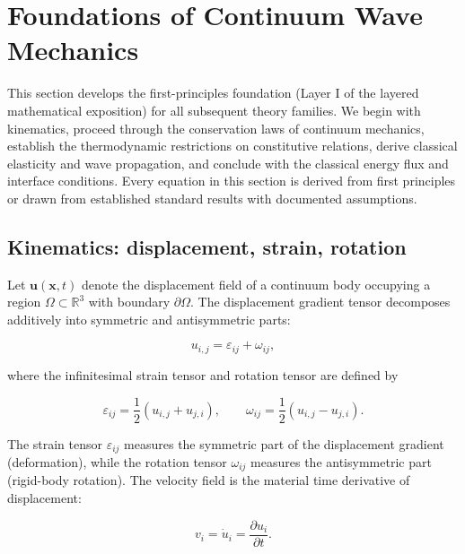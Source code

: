 \section{Foundations of Continuum Wave Mechanics}
\label{sec:foundations}

This section develops the first-principles foundation (Layer I of the layered mathematical exposition) for all subsequent theory families. We begin with kinematics, proceed through the conservation laws of continuum mechanics, establish the thermodynamic restrictions on constitutive relations, derive classical elasticity and wave propagation, and conclude with the classical energy flux \cite{Biot1956} and interface conditions. Every equation in this section is derived from first principles or drawn from established standard results with documented assumptions.

\subsection{Kinematics: displacement, strain, rotation}
\label{sec:3.1}

Let $\bm{u}(\bm{x},t)$ denote the displacement field of a continuum body occupying a region $\Omega \subset \mathbb{R}^3$ with boundary $\partial\Omega$. The displacement gradient tensor decomposes additively into symmetric and antisymmetric parts:

\begin{equation}
u_{i,j} = \varepsilon_{ij} + \omega_{ij},
\label{eq:3.1}
\end{equation}

where the infinitesimal strain tensor and rotation tensor are defined by

\begin{equation}
\varepsilon_{ij} = \frac{1}{2}(u_{i,j} + u_{j,i}),
\qquad
\omega_{ij} = \frac{1}{2}(u_{i,j} - u_{j,i}).
\label{eq:3.2}
\end{equation}

The strain tensor $\varepsilon_{ij}$ measures the symmetric part of the displacement gradient (deformation), while the rotation tensor $\omega_{ij}$ measures the antisymmetric part (rigid-body rotation). The velocity field is the material time derivative of displacement:

\begin{equation}
v_i = \dot{u}_i = \frac{\partial u_i}{\partial t}.
\label{eq:3.3}
\end{equation}

